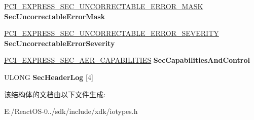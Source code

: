 \begin{DoxyCompactItemize}
\item 
\mbox{\label{struct___p_c_i___e_x_p_r_e_s_s___a_e_r___c_a_p_a_b_i_l_i_t_y_abbace7e2e37922320ac7922b69eee1ee}} 
\hyperlink{union___p_c_i___e_x_p_r_e_s_s___s_e_c___u_n_c_o_r_r_e_c_t_a_b_l_e___e_r_r_o_r___m_a_s_k}{P\+C\+I\+\_\+\+E\+X\+P\+R\+E\+S\+S\+\_\+\+S\+E\+C\+\_\+\+U\+N\+C\+O\+R\+R\+E\+C\+T\+A\+B\+L\+E\+\_\+\+E\+R\+R\+O\+R\+\_\+\+M\+A\+SK} {\bfseries Sec\+Uncorrectable\+Error\+Mask}
\item 
\mbox{\label{struct___p_c_i___e_x_p_r_e_s_s___a_e_r___c_a_p_a_b_i_l_i_t_y_a61c6801366fb643fb8f3a605e0ebb931}} 
\hyperlink{union___p_c_i___e_x_p_r_e_s_s___s_e_c___u_n_c_o_r_r_e_c_t_a_b_l_e___e_r_r_o_r___s_e_v_e_r_i_t_y}{P\+C\+I\+\_\+\+E\+X\+P\+R\+E\+S\+S\+\_\+\+S\+E\+C\+\_\+\+U\+N\+C\+O\+R\+R\+E\+C\+T\+A\+B\+L\+E\+\_\+\+E\+R\+R\+O\+R\+\_\+\+S\+E\+V\+E\+R\+I\+TY} {\bfseries Sec\+Uncorrectable\+Error\+Severity}
\item 
\mbox{\label{struct___p_c_i___e_x_p_r_e_s_s___a_e_r___c_a_p_a_b_i_l_i_t_y_ad56198f5f4c22518fb013c95d50f34a3}} 
\hyperlink{union___p_c_i___e_x_p_r_e_s_s___s_e_c___a_e_r___c_a_p_a_b_i_l_i_t_i_e_s}{P\+C\+I\+\_\+\+E\+X\+P\+R\+E\+S\+S\+\_\+\+S\+E\+C\+\_\+\+A\+E\+R\+\_\+\+C\+A\+P\+A\+B\+I\+L\+I\+T\+I\+ES} {\bfseries Sec\+Capabilities\+And\+Control}
\item 
\mbox{\label{struct___p_c_i___e_x_p_r_e_s_s___a_e_r___c_a_p_a_b_i_l_i_t_y_ae61475d1af147e0a73cf0459ad5862b7}} 
U\+L\+O\+NG {\bfseries Sec\+Header\+Log} \mbox{[}4\mbox{]}
\end{DoxyCompactItemize}


该结构体的文档由以下文件生成\+:\begin{DoxyCompactItemize}
\item 
E\+:/\+React\+O\+S-\/0../sdk/include/xdk/iotypes.\+h\end{DoxyCompactItemize}
